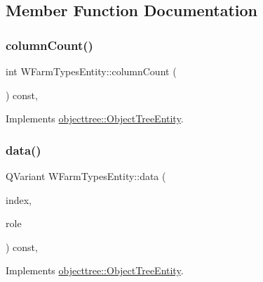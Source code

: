 \subsection{Member Function Documentation}
\mbox{\label{classobjecttree_1_1_w_farm_types_entity_aef59def54e47861bf44979b11ec0deb6}} 
\subsubsection{\texorpdfstring{columnCount()}{columnCount()}}
{\footnotesize\ttfamily int W\+Farm\+Types\+Entity\+::column\+Count (\begin{DoxyParamCaption}{ }\end{DoxyParamCaption}) const\hspace{0.3cm}{\ttfamily [override]}, {\ttfamily [virtual]}}



Implements \mbox{\hyperlink{classobjecttree_1_1_object_tree_entity_a70fd25eccf88b305e9db15fbe3daeae8}{objecttree\+::\+Object\+Tree\+Entity}}.

\mbox{\label{classobjecttree_1_1_w_farm_types_entity_af7ca039e9e86f51bb196e4faf3ee1989}} 
\subsubsection{\texorpdfstring{data()}{data()}}
{\footnotesize\ttfamily Q\+Variant W\+Farm\+Types\+Entity\+::data (\begin{DoxyParamCaption}\item[{const Q\+Model\+Index \&}]{index,  }\item[{int}]{role }\end{DoxyParamCaption}) const\hspace{0.3cm}{\ttfamily [override]}, {\ttfamily [virtual]}}



Implements \mbox{\hyperlink{classobjecttree_1_1_object_tree_entity_a2413c6573de18b451d97eb3800f10f35}{objecttree\+::\+Object\+Tree\+Entity}}.

